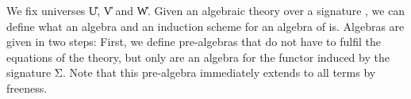 \documentclass{easychair}
\begin{document}
We fix universes \U{U}, \U{V} and \U{W}.
Given an algebraic theory
\AgdaSpace{}%
\AgdaSymbol{:}\AgdaSpace{}%
\AgdaSpace{}%
\AgdaSpace{}%
\AgdaSpace{}%
over a signature , we can define what an algebra and an induction
scheme for an algebra of  is.
Algebras are given in two steps: First, we define pre-algebras that do not have
to fulfil the equations of the theory, but only are an algebra for the functor
induced by the signature Σ.
Note that this pre-algebra immediately extends to all terms by freeness.
\begin{code}%
\>[0][@{}l@{\AgdaIndent{1}}]%
\>[2]\AgdaSpace{}%
\AgdaSpace{}%
\AgdaSymbol{:}\AgdaSpace{}%
\AgdaSymbol{(}\AgdaSpace{}%
\AgdaSpace{}%
\AgdaSpace{}%
\AgdaSpace{}%
\AgdaSymbol{)}\AgdaSpace{}%
\AgdaSpace{}%
\AgdaSpace{}%
\<%
\\
\>[2][@{}l@{\AgdaIndent{0}}]%
\>[4][@{}l@{\AgdaIndent{0}}]%
\>[6]%
\>[19]\AgdaSymbol{:}\AgdaSpace{}%
\AgdaSpace{}%
\<%
\\
%
\>[6]%
\>[15]\AgdaSymbol{:}\AgdaSpace{}%
\AgdaSymbol{(}\AgdaSpace{}%
\AgdaSymbol{:}\AgdaSpace{}%
\AgdaSpace{}\AgdaSymbol{)}\AgdaSpace{}%
\AgdaSymbol{(}\AgdaSpace{}%
\AgdaSymbol{:}\AgdaSpace{}%
\AgdaSpace{}%
\AgdaSpace{}%
\AgdaSpace{}%
\AgdaSpace{}%
\AgdaSymbol{)}\AgdaSpace{}%
\AgdaSpace{}%
\<%
\\
%
\\[\AgdaEmptyExtraSkip]%
%
\>[4]\AgdaSpace{}%
\AgdaSymbol{:}\AgdaSpace{}%
\AgdaSpace{}%
\AgdaSpace{}%
\AgdaSpace{}%
\AgdaSpace{}%
\<%
\\
%
\>[4]\AgdaSpace{}%
\AgdaSymbol{=}\AgdaSpace{}%
\AgdaSpace{}%
\AgdaSpace{}%
\AgdaSpace{}%
\AgdaSpace{}%
\AgdaSymbol{)}\AgdaSpace{}%
\<%
\end{code}
\end{document}
